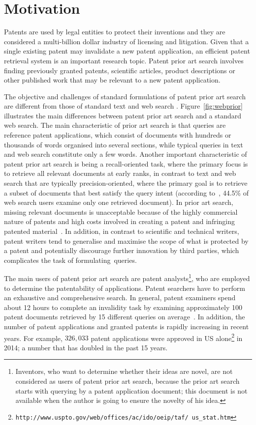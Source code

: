 \section{Motivation}
\label{sec:Motivation}
Patents are used by legal entities to protect their inventions and they are considered a multi-billion dollar industry of licensing and litigation. Given that a single existing patent may invalidate a new patent application, an efficient patent retrieval system is an important research topic. 
Patent prior art search involves finding previously granted patents, scientific articles, product
descriptions or other published work that may be relevant to a new patent application. 

The objective and challenges of standard formulations of patent prior art
search are different from those of standard text and web search \citep{magdy2012toward}.
Figure~\ref{fig:webprior} illustrates the main differences between 
patent prior art search and a standard web search.
The main characteristic of prior art search is that queries are reference patent
applications, which consist of documents with hundreds or thousands of
words organised into several sections, while typical queries in text
and web search constitute only a few words. 
Another important characteristic of patent prior art
search is being a recall-oriented task, where the primary focus is to
retrieve all relevant documents at early ranks, in contrast to text
and web search that are typically precision-oriented, where the primary goal is
to retrieve a subset of documents that best satisfy the query
intent (according to~\citep{zhang2010search}, 44.5\% of web search users examine only one retrieved document). 
In prior art search, missing relevant documents is unacceptable because of the highly commercial nature of patents and high costs involved
in creating a patent and infringing patented material~\citep{joho2010survey}. 
In addition, in contrast to scientific and technical writers, patent writers
tend to generalise and maximise the scope of what is protected by a
patent and potentially discourage further innovation by third parties,
which complicates the task of formulating~queries. 

The main users of patent prior art search are 
patent analysts\footnote{Inventors, who want to determine whether their ideas are novel, 
are not considered as users of patent prior art search, because the prior art search starts with querying by a patent application document; this document is not available when  the author is going to ensure the novelty of his idea.}, 
who are employed to determine the patentability 
of applications. 
Patent searchers have to perform an exhaustive and comprehensive search. In general, patent
examiners spend about 12 hours to complete an invalidity task by examining
approximately 100 patent documents retrieved by 15 different queries on average~\citep{joho2010survey}. 
In addition, the number of patent applications and granted patents is rapidly increasing in recent years. For example, $326,033$ patent applications were approved in US alone\footnote{\texttt{http://www.uspto.gov/web/offices/ac/ido/oeip/taf/ us\_stat.htm}} in 2014; a number that has doubled in the past 15 years.

